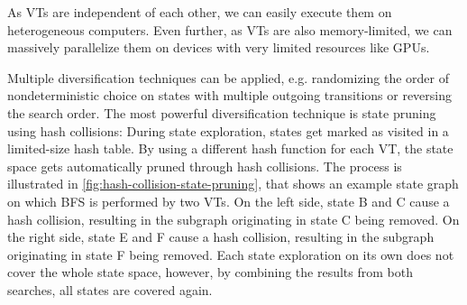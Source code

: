 \documentclass[
fancyheadings, %
%
%
]{stsreprt}
\begin{document}

As VTs are independent of each other, we can easily execute them on heterogeneous computers.
Even further, as VTs are also memory-limited, we can massively parallelize them on devices with very limited resources like GPUs.

Multiple diversification techniques can be applied, e.g. randomizing the order of nondeterministic choice on states with multiple outgoing transitions or reversing the search order.
The most powerful diversification technique is state pruning using hash collisions:
During state exploration, states get marked as visited in a limited-size hash table.
By using a different hash function for each VT, the state space gets automatically pruned through hash collisions.
The process is illustrated in \cref{fig:hash-collision-state-pruning}, that shows an example state graph on which BFS is performed by two VTs.
On the left side, state B and C cause a hash collision, resulting in the subgraph originating in state C being removed.
On the right side, state E and F cause a hash collision, resulting in the subgraph originating in state F being removed.
Each state exploration on its own does not cover the whole state space, however, by combining the results from both searches, all states are covered again.
\end{document}
